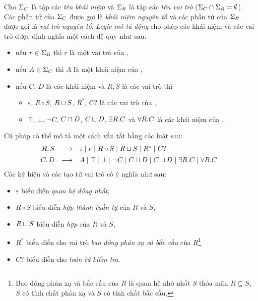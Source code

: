 \begin{Definition}
\label{def:ALCRegSyntax}
Cho $\Sigma_C$ là tập các {\em tên khái niệm} và $\Sigma_R$ là tập các {\em tên vai trò} ($\Sigma_C \cap \Sigma_R = \emptyset$). Các phần tử của $\Sigma_C$ được gọi là {\em khái niệm nguyên tố} và các phần tử của $\Sigma_R$ được gọi là {\em vai trò nguyên tố}. {\em Logic mô tả động} \ALCreg cho phép các khái niệm và các vai trò được định nghĩa một cách đệ quy như~sau:
\begin{itemize}
	\item nếu $r \in \Sigma_R$ thì $r$ là một vai trò của \ALCreg,
	\item nếu $A \in \Sigma_C$ thì $A$ là một khái niệm của \ALCreg,
	\item nếu $C$, $D$ là các khái niệm và $R, S$ là các vai trò thì 
	\begin{itemize}
		\item $\varepsilon$, $R \circ S$, $R \sqcup S$, $R^*$, $C?$ là các vai trò của \ALCreg,
		\item $\top$, $\bot$, $\neg C$, $C \sqcap D$, $C \sqcup D$, $\exists R.C$ và $\forall R.C$ là các khái niệm của \ALCreg.\myend
	\end{itemize}
\end{itemize}
\end{Definition}
%
\noindent
Cú pháp \ALCreg có thể mô tả một cách vắn tắt bằng các luật sau:
\[
	\begin{array}{r c l}
		R, S & \longrightarrow &
		\varepsilon \mid
		r \mid 
		R \circ S \mid
		R \mor S \mid
		R^* \mid
		C?\\[1ex]
%
		C, D & \longrightarrow &
		A \mid 
		\top \mid 
		\bot \mid 
		\neg C \mid 
		C \mand D \mid 
		C \mor D \mid 
		\E R.C \mid
		\V R.C
	\end{array}
\]
%
Các ký hiệu và các tạo tử vai trò có ý nghĩa như sau:
\begin{itemize}
	\item $\varepsilon$ biểu diễn {\em quan hệ đồng nhất},
	\item $R \circ S$ biểu diễn {\em hợp thành tuần tự} của $R$ và $S$,
	\item $R \sqcup S$ biểu diễn {\em hợp} của $R$ và $S$,
	\item $R^*$ biểu diễn cho vai trò {\em bao đóng phản xạ và bắc cầu} của $R$\footnote{Bao đóng phản xạ và bắc cầu của $R$ là quan hệ nhỏ nhất $S$ thỏa mãn $R \subseteq S$, $S$ có tính chất phản xạ và $S$ có tính chất bắc cầu.}
	\item $C?$ biểu diễn cho {\em toán tử kiểm tra}.
\end{itemize}


